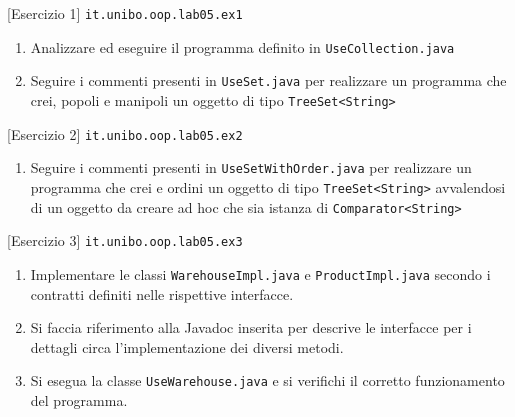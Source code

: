 \documentclass[presentation]{beamer}
\begin{document}

\begin{frame}{[Esercizio 1] \texttt{it.unibo.oop.lab05.ex1}}
\begin{enumerate}
\item Analizzare ed eseguire il programma definito in \texttt{UseCollection.java}
\item Seguire i commenti presenti in \texttt{UseSet.java} per realizzare un programma che crei, popoli e manipoli un oggetto di tipo \texttt{TreeSet<String>}
\end{enumerate}
\end{frame}

\begin{frame}{[Esercizio 2] \texttt{it.unibo.oop.lab05.ex2}}
\begin{enumerate}
\item Seguire i commenti presenti in \texttt{UseSetWithOrder.java} per realizzare un programma che crei e ordini un oggetto di tipo \texttt{TreeSet<String>} avvalendosi di un oggetto da creare ad hoc che sia istanza di \texttt{Comparator<String>}
\end{enumerate}
\end{frame}

\begin{frame}{[Esercizio 3] \texttt{it.unibo.oop.lab05.ex3}}
\begin{enumerate}
\item Implementare le classi \texttt{WarehouseImpl.java} e \texttt{ProductImpl.java} secondo i contratti definiti nelle rispettive interfacce.
\item Si faccia riferimento alla Javadoc inserita per descrive le interfacce per i dettagli circa l'implementazione dei diversi metodi.
\item Si esegua la classe \texttt{UseWarehouse.java} e si verifichi il corretto funzionamento del programma.
\end{enumerate}
\end{frame}
\end{document}
